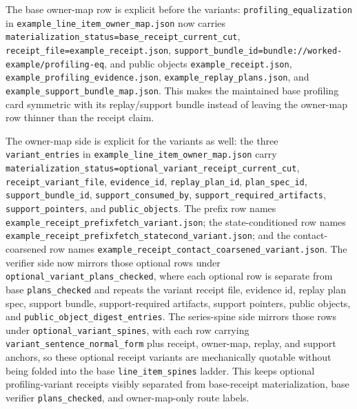 \documentclass[11pt]{article}
\begin{document}
The base owner-map row is explicit before the variants: \nolinkurl{profiling_equalization} in \nolinkurl{example_line_item_owner_map.json} now carries \nolinkurl{materialization_status=base_receipt_current_cut}, \nolinkurl{receipt_file=example_receipt.json}, \nolinkurl{support_bundle_id=bundle://worked-example/profiling-eq}, and public objects \nolinkurl{example_receipt.json}, \nolinkurl{example_profiling_evidence.json}, \nolinkurl{example_replay_plans.json}, and \nolinkurl{example_support_bundle_map.json}. This makes the maintained base profiling card symmetric with its replay/support bundle instead of leaving the owner-map row thinner than the receipt claim.

The owner-map side is explicit for the variants as well: the three \nolinkurl{variant_entries} in \nolinkurl{example_line_item_owner_map.json} carry \nolinkurl{materialization_status=optional_variant_receipt_current_cut}, \nolinkurl{receipt_variant_file}, \nolinkurl{evidence_id}, \nolinkurl{replay_plan_id}, \nolinkurl{plan_spec_id}, \nolinkurl{support_bundle_id}, \nolinkurl{support_consumed_by}, \nolinkurl{support_required_artifacts}, \nolinkurl{support_pointers}, and \nolinkurl{public_objects}. The prefix row names \nolinkurl{example_receipt_prefixfetch_variant.json}; the state-conditioned row names \nolinkurl{example_receipt_prefixfetch_statecond_variant.json}; and the contact-coarsened row names \nolinkurl{example_receipt_contact_coarsened_variant.json}. The verifier side now mirrors those optional rows under \nolinkurl{optional_variant_plans_checked}, where each optional row is separate from base \nolinkurl{plans_checked} and repeats the variant receipt file, evidence id, replay plan spec, support bundle, support-required artifacts, support pointers, public objects, and \nolinkurl{public_object_digest_entries}. The series-spine side mirrors those rows under \nolinkurl{optional_variant_spines}, with each row carrying \nolinkurl{variant_sentence_normal_form} plus receipt, owner-map, replay, and support anchors, so these optional receipt variants are mechanically quotable without being folded into the base \nolinkurl{line_item_spines} ladder. This keeps optional profiling-variant receipts visibly separated from base-receipt materialization, base verifier \nolinkurl{plans_checked}, and owner-map-only route labels.
\end{document}
